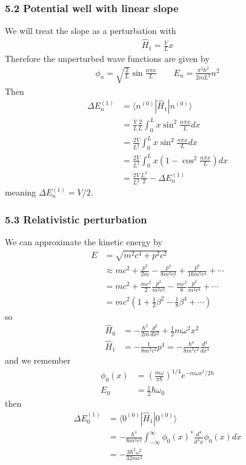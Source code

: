 \documentclass[10pt,a4paper]{article}
\theoremstyle{definition}
\begin{document}
\subsubsection{5.2 Potential well with linear slope}
We will treat the slope as a perturbation with
\begin{align}
\hat{H}_1=\frac{V}{L}x
\end{align} 
Therefore the unperturbed wave functions are given by
\begin{align}
\phi_n=\sqrt{\frac{2}{L}}\sin\frac{n\pi x}{L}\qquad
E_n=\frac{\pi^2\hbar^2}{2mL^2}n^2
\end{align}
Then
\begin{align}
\Delta E_n^{(1)}
&=\langle n^{(0)}|\hat{H}_1|n^{(0)}\rangle\\
&=\frac{V}{L}\frac{2}{L}\int_0^L x\sin^2\frac{n\pi x}{L}dx\\
&=\frac{2V}{L^2}\int_0^L x\sin^2\frac{n\pi x}{L}dx\\
&=\frac{2V}{L^2}\int_0^L x\left(1-\cos^2\frac{n\pi x}{L}\right)dx\\
&=\frac{2V}{L^2}\frac{L^2}{2}-\Delta E_n^{(1)}
\end{align}
meaning $\Delta E_n^{(1)}=V/2$.

\subsubsection{5.3 Relativistic perturbation}
We can approximate the kinetic energy by
\begin{align}
E&=\sqrt{m^2c^4+p^2c^2}\\
&\approx mc^2+\frac{p^2}{2m}-\frac{p^4}{8m^3c^2}+\frac{p^6}{16m^5c^4}+\cdots\\
&=mc^2+\frac{mc^2}{2}\frac{p^2}{m^2c^2}-\frac{mc^2}{8}\frac{p^4}{m^4c^4}+\cdots\\
&=mc^2\left(1+\frac{1}{2}\beta^2-\frac{1}{8}\beta^4+\cdots\right)
\end{align}
so
\begin{align}
\hat{H}_0&=-\frac{\hbar^2}{2m}\frac{d^2}{dx^2}+\frac{1}{2}m\omega^2x^2\\
\hat{H}_1&=-\frac{1}{8m^3c^2}p^4=-\frac{\hbar^4}{8m^3c^2}\frac{d^4}{dx^4}
\end{align}
and we remember
\begin{align}
\phi_0(x)&=\left(\frac{m\omega}{\pi\hbar}\right)^{1/4}e^{-m\omega x^2/2\hbar}\\
E_0&=\frac{1}{2}\hbar\omega_0
\end{align}
then
\begin{align}
\Delta E_0^{(1)}&=\langle 0^{(0)}|\hat{H}_1|0^{(0)}\rangle\\
&=-\frac{\hbar^4}{8m^3c^2}\int_{-\infty}^\infty\phi_0(x)^*\frac{d^4}{d^4x}\phi_0(x)dx\\
&=-\frac{3\hbar^2\omega^2}{32mc^2}
\end{align}
\end{document}
